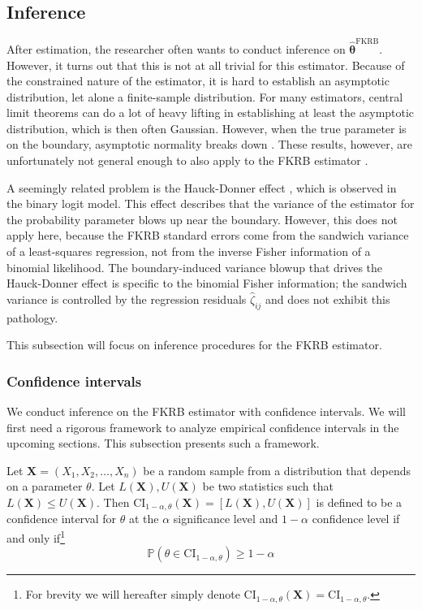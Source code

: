 \subsection{Inference}
\label{sec:Inference}
After estimation, the researcher often wants to conduct inference on $\hat{\bm{\theta}}^{\mathrm{FKRB}}$.
However, it turns out that this is not at all trivial for this estimator.
Because of the constrained nature of the estimator, it is hard to establish an asymptotic distribution, let alone a finite-sample distribution.
For many estimators, central limit theorems can do a lot of heavy lifting in establishing at least the asymptotic distribution, which is then often Gaussian.
However, when the true parameter is on the boundary, asymptotic normality breaks down \citep{Andrews1999}.
These results, however, are unfortunately not general enough to also apply to the FKRB estimator \citep{FoxKimRyanBajari2011}.

A seemingly related problem is the Hauck-Donner effect \citep{HauckDonner1977}, which is observed in the binary logit model.
This effect describes that the variance of the estimator for the probability parameter blows up near the boundary.
However, this does not apply here, because the FKRB standard errors come from the sandwich variance of a least-squares regression, not from the inverse Fisher information of a binomial likelihood.
The boundary-induced variance blowup that drives the Hauck-Donner effect is specific to the binomial Fisher information; the sandwich variance is controlled by the regression residuals $\hat{\zeta}_{ij}$ and does not exhibit this pathology.

This subsection will focus on inference procedures for the FKRB estimator.

\subsubsection{Confidence intervals}
\label{sec:confidenceintervals}
We conduct inference on the FKRB estimator with confidence intervals.
We will first need a rigorous framework to analyze empirical confidence intervals in the upcoming sections.
This subsection presents such a framework.

Let $\bm{X} = (X_1, X_2, \ldots, X_n)$ be a random sample from a distribution that depends on a parameter $\theta$.
Let $L(\bm{X}), U(\bm{X})$ be two statistics such that $L(\bm{X}) \leq U(\bm{X})$. Then $\mathrm{CI}_{1-\alpha,\theta}(\bm{X}) = [L(\bm{X}),U(\bm{X})]$ is defined to be a confidence interval for $\theta$ at the $\alpha$ significance level and $1-\alpha$ confidence level if and only if\footnote{For brevity we will hereafter simply denote $\mathrm{CI}_{1-\alpha,\theta}(\bm{X}) = \mathrm{CI}_{1-\alpha,\theta}$.}
\begin{equation}
\label{eq:confidenceinterval}
    \mathbb{P}(\theta \in \mathrm{CI}_{1-\alpha,\theta}) \geq 1- \alpha
\end{equation}

